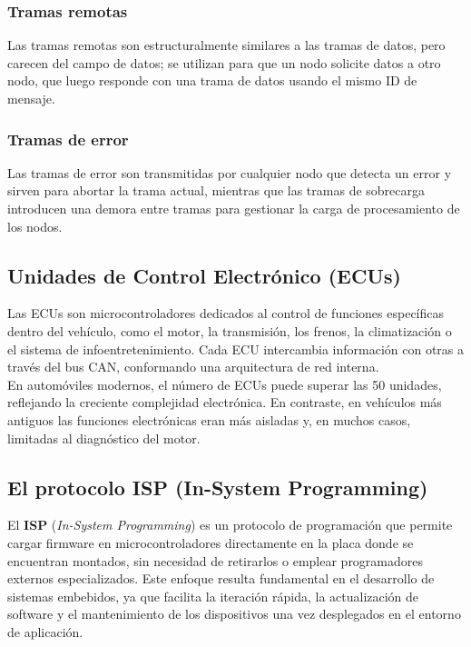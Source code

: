 \subsubsection*{Tramas remotas}
Las tramas remotas son estructuralmente similares a las tramas de datos, pero carecen del campo de datos; se utilizan para que un nodo solicite datos a otro nodo, que luego responde con una trama de datos usando el mismo ID de mensaje.

\subsubsection*{Tramas de error}
Las tramas de error son transmitidas por cualquier nodo que detecta un error y sirven para abortar la trama actual, mientras que las tramas de sobrecarga introducen una demora entre tramas para gestionar la carga de procesamiento de los nodos.\\


\subsection{Unidades de Control Electrónico (ECUs)}

Las ECUs son microcontroladores dedicados al control de funciones específicas dentro del vehículo, como el motor, la transmisión, los frenos, la climatización o el sistema de infoentretenimiento. Cada ECU intercambia información con otras a través del bus CAN, conformando una arquitectura de red interna. \\

En automóviles modernos, el número de ECUs puede superar las 50 unidades, reflejando la creciente complejidad electrónica. En contraste, en vehículos más antiguos las funciones electrónicas eran más aisladas y, en muchos casos, limitadas al diagnóstico del motor.

\subsection{El protocolo ISP (In-System Programming)}
El \textbf{ISP} (\textit{In-System Programming}) es un protocolo de programación que permite cargar firmware en microcontroladores directamente en la placa donde se encuentran montados, sin necesidad de retirarlos o emplear programadores externos especializados. Este enfoque resulta fundamental en el desarrollo de sistemas embebidos, ya que facilita la iteración rápida, la actualización de software y el mantenimiento de los dispositivos una vez desplegados en el entorno de aplicación.

